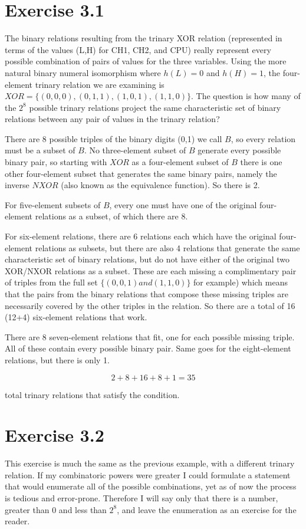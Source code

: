 \documentclass[12pt]{article}
\begin{document}
\section{Exercise 3.1}

The binary relations resulting from the trinary XOR relation (represented in terms of the values (L,H) for CH1, CH2, and CPU) really represent every possible combination of pairs of values for the three variables.  Using the more natural binary numeral isomorphism where $h(L)=0$ and $h(H)=1$, the four-element trinary relation we are examining is $XOR=\{(0,0,0),(0,1,1),(1,0,1),(1,1,0)\}$.  The question is how many of the $2^8$ possible trinary relations project the same characteristic set of binary relations between any pair of values in the trinary relation?  

There are 8 possible triples of the binary digits (0,1) we call $B$, so every relation must be a subset of $B$.  No three-element subset of $B$ generate every possible binary pair, so starting with $XOR$ as a four-element subset of $B$ there is one other four-element subset that generates the same binary pairs, namely the inverse $NXOR$ (also known as the equivalence function).  So there is 2.  

For five-element subsets of $B$, every one must have one of the original four-element relations as a subset, of which there are 8.  

For six-element relations, there are 6 relations each which have the original four-element relations as subsets, but there are also 4 relations that generate the same characteristic set of binary relations, but do not have either of the original two XOR/NXOR relations as a subset.  These are each missing a complimentary pair of triples from the full set $\{(0,0,1) and (1,1,0)\}$ for example) which means that the pairs from the binary relations that compose these missing triples are necessarily covered by the other triples in the relation.  So there are a total of 16 (12+4) six-element relations that work.  

There are 8 seven-element relations that fit, one for each possible missing triple.  All of these contain every possible binary pair.  Same goes for the eight-element relations, but there is only 1.  

$$ 2 + 8 + 16 + 8 + 1 = 35 $$

total trinary relations that satisfy the condition. 

\section{Exercise 3.2}

This exercise is much the same as the previous example, with a different trinary relation.  If my combinatoric powers were greater I could formulate a statement that would enumerate all of the possible combinations, yet as of now the process is tedious and error-prone.  Therefore I will say only that there is a number, greater than 0 and less than $2^8$, and leave the enumeration as an exercise for the reader.  
\end{document}
